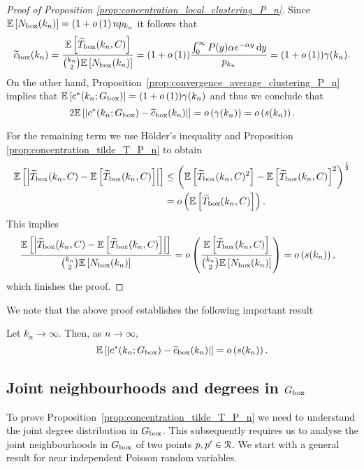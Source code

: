 \begin{proof}[Proof of Proposition \ref{prop:concentration_local_clustering_P_n}]
Since $\mathbb{E}\left[N_{\text{box}}(k_n)\right] = (1+o\left(1\right)n p_{k_n}$ it follows that
\[
	\widetilde{c}_{\text{box}}(k_n) = \frac{\mathbb{E}\left[\widetilde{T}_{\text{box}}(k_n,C)\right]}{\binom{k_n}{2}\mathbb{E}\left[N_{\text{box}}(k_n)\right]}
	= (1+o\left(1\right)) \frac{\int_0^\infty P(y) \alpha e^{-\alpha y} \operatorname{\mathrm{d}\hspace{-2pt}} y}{p_{k_n}}
	= (1 + o\left(1\right)) \gamma(k_n).
\]
On the other hand, Proposition~\ref{prop:convergence_average_clustering_P_n} implies that $\mathbb{E}\left[c^\ast(k_n; G_{\mathrm{box}})\right] = (1+o\left(1\right))\gamma(k_n)$ and thus we conclude that
\[
	2\mathbb{E}\left[\left|c^\ast(k_n; G_{\mathrm{box}}) - \widetilde{c}_{\text{box}}(k_n)\right|\right]
	= o\left(\gamma(k_n)\right) = o\left(s(k_n)\right).	
\]

For the remaining term we use H\"{o}lder's inequality and Proposition \ref{prop:concentration_tilde_T_P_n} to obtain
\begin{align*}
	\mathbb{E}\left[\left|\widetilde{T}_{\text{box}}(k_n,C) - \mathbb{E}\left[\widetilde{T}_{\text{box}}(k_n,C)\right]\right|\right]
	&\le \left(\mathbb{E}\left[\widetilde{T}_{\text{box}}(k_n,C)^2\right] 
		- \mathbb{E}\left[\widetilde{T}_{\text{box}}(k_n,C)\right]^2\right)^{\frac{1}{2}}\\
	&= o\left(\mathbb{E}\left[\widetilde{T}_{\text{box}}(k_n,C)\right]\right).
\end{align*}
This implies
\begin{align*}
	\frac{\mathbb{E}\left[\left|\widetilde{T}_{\text{box}}(k_n,C) - \mathbb{E}\left[\widetilde{T}_{\text{box}}(k_n,C)\right]\right|\right]}
		{\binom{k_n}{2}\mathbb{E}\left[N_{\text{box}}(k_n)\right]}
	&= o\left(\frac{\mathbb{E}\left[\widetilde{T}_{\text{box}}(k_n,C)\right]}{\binom{k_n}{2}\mathbb{E}\left[N_{\text{box}}(k_n)\right]}\right)
	= o\left(s(k_n)\right),
\end{align*}
which finishes the proof.
\end{proof}

We note that the above proof establishes the following important result

\begin{corollary}\label{cor:c_ast_box_2_tilde_c_box}
Let $k_n \to \infty$. Then, as $n \to \infty$,
\[
	\mathbb{E}\left[\left|c^\ast(k_n; G_{\mathrm{box}}) - \widetilde{c}_{\mathrm{box}}(k_n)\right|\right] = o\left(s(k_n)\right).
\]
\end{corollary}

\subsection{Joint neighbourhoods and degrees in $G_{\mathrm{box}}$}

To prove Proposition~\ref{prop:concentration_tilde_T_P_n} we need to understand the joint degree distribution in $G_{\mathrm{box}}$. This subsequently requires us to analyse the joint neighbourhoods in $G_{\mathrm{box}}$ of two points $p, p^\prime \in {\mathcal R}$. We start with a general result for near independent Poisson random variables.

